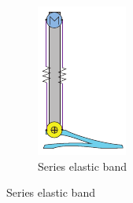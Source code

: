 \begin{figure}[hb!]
\begin{subfigure}{.19\textwidth}
    \includegraphics[width=\linewidth]{figures/illustration_serial_elastic_band.pdf}
    \caption{Series elastic band}
    \label{fig:series_elastic_band}
  \end{subfigure}
\end{figure}  


